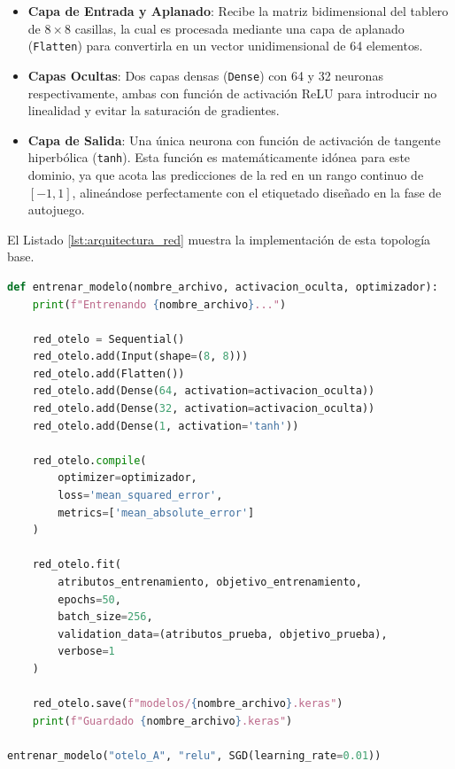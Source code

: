 \documentclass[conference]{IEEEtran}
\begin{document}
\begin{itemize}
    \item \textbf{Capa de Entrada y Aplanado}: Recibe la matriz bidimensional del tablero de $8 \times 8$ casillas, la cual es procesada mediante una capa de aplanado (\texttt{Flatten}) para 
    convertirla en un vector unidimensional de 64 elementos.\\
    \item \textbf{Capas Ocultas}: Dos capas densas (\texttt{Dense}) con 64 y 32 neuronas respectivamente, ambas con función de activación ReLU para introducir no linealidad
    y evitar la saturación de gradientes.\\
    \item \textbf{Capa de Salida}: Una única neurona con función de activación de tangente hiperbólica (\texttt{tanh}). Esta función es matemáticamente idónea para este 
    dominio, ya que acota las predicciones de la red en un rango continuo de $[-1, 1]$, alineándose perfectamente con el etiquetado diseñado en la fase de autojuego.\\
\end{itemize}

El Listado \ref{lst:arquitectura_red} muestra la implementación de esta topología base.

\begin{lstlisting}[language=Python, caption={Construcción y compilación de la arquitectura base de la red neuronal mediante Keras.}, label={lst:arquitectura_red}]
def entrenar_modelo(nombre_archivo, activacion_oculta, optimizador):
    print(f"Entrenando {nombre_archivo}...")

    red_otelo = Sequential()
    red_otelo.add(Input(shape=(8, 8)))
    red_otelo.add(Flatten())
    red_otelo.add(Dense(64, activation=activacion_oculta))
    red_otelo.add(Dense(32, activation=activacion_oculta))
    red_otelo.add(Dense(1, activation='tanh'))

    red_otelo.compile(
        optimizer=optimizador,
        loss='mean_squared_error',
        metrics=['mean_absolute_error']
    )

    red_otelo.fit(
        atributos_entrenamiento, objetivo_entrenamiento,
        epochs=50,
        batch_size=256,
        validation_data=(atributos_prueba, objetivo_prueba),
        verbose=1
    )

    red_otelo.save(f"modelos/{nombre_archivo}.keras")
    print(f"Guardado {nombre_archivo}.keras")

entrenar_modelo("otelo_A", "relu", SGD(learning_rate=0.01))

\end{lstlisting}
\end{document}

